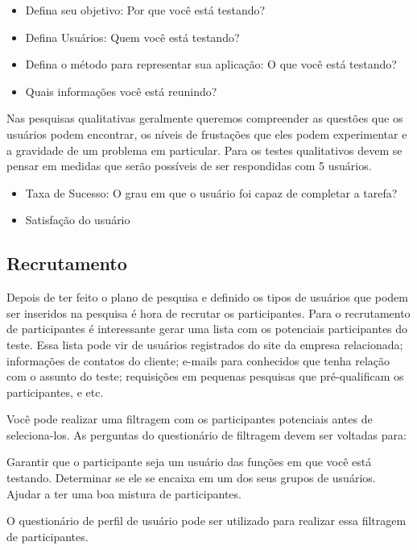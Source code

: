 \begin{itemize}
\item Defina seu objetivo: Por que você está testando? %
\item Defina Usuários: Quem você está testando? %
\item Defina o método para representar sua aplicação: O que você está testando?
\item Quais informações você está reunindo? 
\end{itemize}

Nas pesquisas qualitativas geralmente queremos compreender as questões que os usuários podem encontrar, os níveis de frustações que eles podem experimentar e a gravidade de um problema em particular. Para os testes qualitativos devem se pensar em medidas que serão possíveis de ser respondidas com 5 usuários. 

\begin{itemize}
\item Taxa de Sucesso: O grau em que o usuário foi capaz de completar a tarefa?
\item Satisfação do usuário
\end{itemize}

\subsection{Recrutamento}

Depois de ter feito o plano de pesquisa e definido os tipos de usuários que podem ser inseridos na pesquisa é hora de recrutar os participantes.
Para o recrutamento de participantes é interessante gerar uma lista com os potenciais participantes do teste. Essa lista pode vir de usuários registrados do site da empresa relacionada; informações de contatos do cliente; e-mails para conhecidos que tenha relação com o assunto do teste; requisições em pequenas pesquisas que pré-qualificam os participantes, e etc.

Você pode realizar uma filtragem com os participantes potenciais antes de seleciona-los. As perguntas do questionário de filtragem devem ser voltadas para:

Garantir que o participante seja um usuário das funções em que você está testando.
Determinar se ele se encaixa em um dos seus grupos de usuários.
Ajudar a ter uma boa mistura de participantes.

O questionário de perfil de usuário pode ser utilizado para realizar essa filtragem de participantes.

